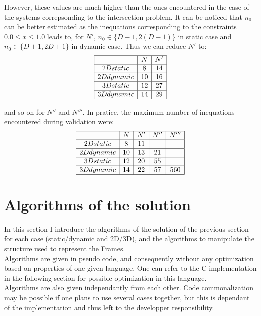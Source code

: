 \documentclass[12pt, a4paper]{article}
\begin{document}
However, these values are much higher than the ones encountered in the case of the systems correpsonding to the intersection problem. It can be noticed that $n_0$ can be better estimated as the inequations corresponding to the constraints $0.0\le x\le1.0$ leads to, for $N'$, $n_0\in\lbrace D-1,2(D-1)\rbrace$ in static case and $n_0\in\lbrace D+1,2D+1\rbrace$ in dynamic case. Thus we can reduce $N'$ to:\\
$$
\begin{array}{|c|c|c|}
\hline
&N&N'\\
\hline
2Dstatic&8&14\\
\hline
2Ddynamic&10&16\\
\hline
3Dstatic&12&27\\
\hline
3Ddynamic&14&29\\
\hline
\end{array}
$$

and so on for $N''$ and $N'''$. In pratice, the maximum number of inequations encountered during validation were:\\
$$
\begin{array}{|c|c|c|c|c|}
\hline
&N&N'&N''&N'''\\
\hline
2Dstatic&8&11&&\\
\hline
2Ddynamic&10&13&21&\\
\hline
3Dstatic&12&20&55&\\
\hline
3Ddynamic&14&22&57&560\\
\hline
\end{array}
$$

\section{Algorithms of the solution}

In this section I introduce the algorithms of the solution of the previous section for each case (static/dynamic and 2D/3D), and the algorithms to manipulate the structure used to represent the Frames.\\

Algorithms are given in pseudo code, and consequently without any optimization based on properties of one given language. One can refer to the C implementation in the following section for possible optimization in this language.\\

Algorithms are also given independantly from each other. Code commonalization may be possible if one plans to use several cases together, but this is dependant of the implementation and thus left to the developper responsibility.\\
\end{document}
